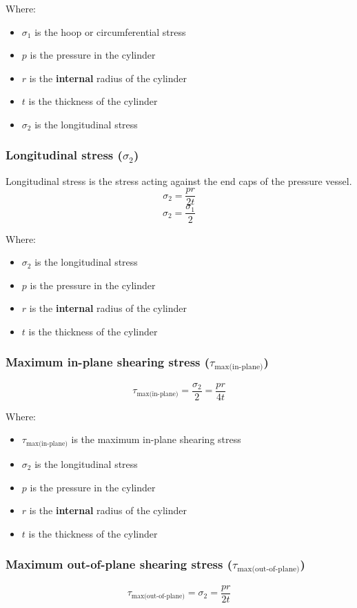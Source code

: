 \documentclass[11pt]{article}
\begin{document}
Where:
\begin{itemize}
\item \(\sigma_1\) is the hoop or circumferential stress
\item \(p\) is the pressure in the cylinder
\item \(r\) is the \textbf{internal} radius of the cylinder
\item \(t\) is the thickness of the cylinder
\item \(\sigma_2\) is the longitudinal stress
\end{itemize}
\subsubsection{Longitudinal stress (\(\sigma_2\))}
\label{sec:orgc5ded60}
Longitudinal stress is the stress acting against the end caps of the pressure vessel.
\[\sigma_2 = \frac{pr}{2t}\]
\[\sigma_2 = \frac{\sigma_1}{2}\]

Where:
\begin{itemize}
\item \(\sigma_2\) is the longitudinal stress
\item \(p\) is the pressure in the cylinder
\item \(r\) is the \textbf{internal} radius of the cylinder
\item \(t\) is the thickness of the cylinder
\end{itemize}
\subsubsection{Maximum in-plane shearing stress (\(\tau_{\text{max(in-plane)}}\))}
\label{sec:org8fc6c64}
\[\tau_{\text{max(in-plane)}} = \frac{\sigma_2}{2} = \frac{pr}{4t}\]

Where:
\begin{itemize}
\item \(\tau_{\text{max(in-plane)}}\) is the maximum in-plane shearing stress
\item \(\sigma_2\) is the longitudinal stress
\item \(p\) is the pressure in the cylinder
\item \(r\) is the \textbf{internal} radius of the cylinder
\item \(t\) is the thickness of the cylinder
\end{itemize}
\subsubsection{Maximum out-of-plane shearing stress (\(\tau_{\text{max(out-of-plane)}}\))}
\label{sec:org147cb3a}
\[\tau_{\text{max(out-of-plane)}} = \sigma_2 = \frac{pr}{2t}\]
\end{document}
